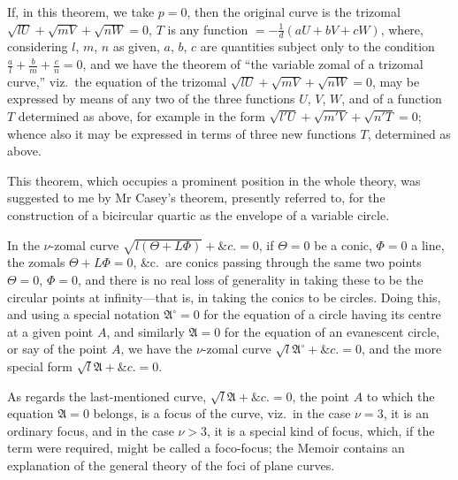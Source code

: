 \documentclass[11pt,a4paper]{article}
\theoremstyle{definition}
\begin{document}
If, in this theorem, we take $p=0$, then the original curve is the trizomal $\sqrt{lU}+\sqrt{mV}+\sqrt{nW}=0$, $T$ is any function $=-\frac{1}{d}(aU+bV+cW)$, where, considering $l$, $m$, $n$ as given, $a$, $b$, $c$ are quantities subject only to the condition $\frac{a}{l}+\frac{b}{m}+\frac{c}{n}=0$, and we have the theorem of ``the variable zomal of a trizomal curve,'' viz.\ the equation of the trizomal $\sqrt{lU}+\sqrt{mV}+\sqrt{nW}=0$, may be expressed by means of any two of the three functions $U$, $V$, $W$, and of a function $T$ determined as above, for example in the form $\sqrt{l'U}+\sqrt{m'V}+\sqrt{n'T}=0$; whence also it may be expressed in terms of three new functions $T$, determined as above.

This theorem, which occupies a prominent position in the whole theory, was suggested to me by Mr Casey's theorem, presently referred to, for the construction of a bicircular quartic as the envelope of a variable circle.

\setcounter{page}{470}

In the $\nu$-zomal curve $\sqrt{l(\Theta+L\Phi)}+\&c.=0$, if $\Theta=0$ be a conic, $\Phi=0$ a line, the zomals $\Theta+L\Phi=0$, \&c.\ are conics passing through the same two points $\Theta=0$, $\Phi=0$, and there is no real loss of generality in taking these to be the circular points at infinity---that is, in taking the conics to be circles. Doing this, and using a special notation $\mathfrak{A}^\circ=0$ for the equation of a circle having its centre at a given point $A$, and similarly $\mathfrak{A}=0$ for the equation of an evanescent circle, or say of the point $A$, we have the $\nu$-zomal curve $\sqrt{l}\mathfrak{A}^\circ+\&c.=0$, and the more special form $\sqrt{l}\mathfrak{A}+\&c.=0$.

As regards the last-mentioned curve, $\sqrt{l}\mathfrak{A}+\&c.=0$, the point $A$ to which the equation $\mathfrak{A}=0$ belongs, is a focus of the curve, viz.\ in the case $\nu=3$, it is an ordinary focus, and in the case $\nu>3$, it is a special kind of focus, which, if the term were required, might be called a foco-focus; the Memoir contains an explanation of the general theory of the foci of plane curves.
\end{document}
